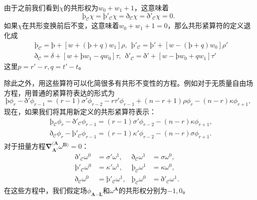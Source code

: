 由于之前我们看到$\chi $的共形权为$w_{0} +w_{1} +1$，这意味着
\begin{equation*}
	\text{þ}_{\mathcal{C}} \chi =\text{þ}'_{\mathcal{C}} \chi =\text{ð} _{\mathcal{C}} \chi =\text{ð} '_{\mathcal{C}} \chi =0.
\end{equation*}
如果$\chi $在共形变换前后不变，这意味着$w_{0} +w_{1} +1=0$，那么共形紧算符的定义退化成
\begin{equation*}
	\begin{aligned}
		& \text{þ}_{\mathcal{C}} =\text{þ}+[ w+(\text{þ}+q)w_{1}] \rho ,\ \ \text{þ}'_{\mathcal{C}} =\text{þ}'+[ w-(\text{þ}+q)w_{0}] \rho '\\
		& \text{ð} _{\mathcal{C}} =\delta +[ w+\text{þ}w_{1} -qw_{0}] \tau ,\ \ \text{ð} '_{\mathcal{C}} =\text{ð} '+[ w-\text{þ}w_{0} +qw_{1}] \tau '
	\end{aligned}
\end{equation*}
这里$p=r'-r,q=t'-t$。



除此之外，用这些算符可以化简很多有共形不变性的方程。例如对于无质量自由场方程，用普通的紧算符表达的形式为
\begin{equation*}
	\text{þ}\phi _{r} -\text{ð} '\phi _{r-1} =( r-1) \sigma '\phi _{r-2} -r\tau '\phi _{r-1} +( n-r+1) \rho \phi _{r} -( n-r) \kappa \phi _{r+1} ,
\end{equation*}
现在，如果我们将其用新定义的共形紧算符表示：
\begin{equation*}
	\begin{aligned}
		& \text{þ}_{\mathcal{C}} \phi _{r} -\text{ð} '_{\mathcal{C}} \phi _{r-1} =(r-1)\sigma '\phi _{r-2} -(n-r)\kappa \phi _{r+1} ,\\
		& \text{ð} _{\mathcal{C}} \phi _{r} -\text{þ}'_{\mathcal{C}} \phi _{r-1} =(r-1)\kappa '\phi _{r-2} -(n-r)\sigma \phi _{r+1} .
	\end{aligned}
\end{equation*}
对于扭量方程$\boldsymbol{\nabla }_{\boldsymbol{A} '}^{(\boldsymbol{A}} \omega ^{\boldsymbol{B})} =0$：
\begin{equation*}
	\begin{aligned}
		\text{ð} '_{\mathcal{C}} \omega ^{0} & =\sigma '\omega ^{1} , & \text{ð} _{\mathcal{C}} \omega ^{1} & =\sigma \omega ^{0} ,\\
		\text{þ}'_{\mathcal{C}} \omega ^{0} & =\kappa '\omega ^{1} , & \text{þ}_{\mathcal{C}} \omega ^{1} & =\kappa \omega ^{0} ,\\
		\text{ð} _{\mathcal{C}} \omega ^{0} & =\text{þ}'_{\mathcal{C}} \omega ^{1} , & \text{þ}_{\mathcal{C}} \omega ^{0} & =\text{ð} '_{\mathcal{C}} \omega ^{1} .
	\end{aligned} \ \ 
\end{equation*}
在这些方程中，我们假定场$\phi _{\boldsymbol{A} \cdots \boldsymbol{L}}$和$\omega ^{\boldsymbol{A}}$的共形权分别为$-1,0$。


